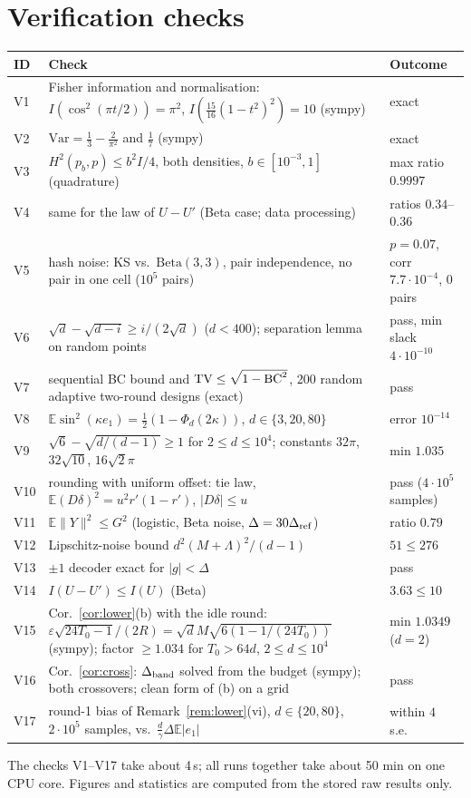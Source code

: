 \documentclass[11pt,a4paper]{article}
\numberwithin{equation}{section}
\theoremstyle{definition}
\theoremstyle{remark}
\newcommand{\E}{\mathbb E}\newcommand{\R}{\mathbb R}\newcommand{\Z}{\mathbb Z}\newcommand{\Prob}{\mathbb P}
\newcommand{\norm}[1]{\lVert #1\rVert}\newcommand{\abs}[1]{\lvert #1\rvert}\newcommand{\ip}[2]{\langle #1,#2\rangle}
\begin{document}
\appendix
\section{Verification checks}\label{app:checks}
\begin{center}\small
\begin{tabularx}{\textwidth}{@{}lXl@{}}
\toprule
ID & Check & Outcome\\
\midrule
V1 & Fisher information and normalisation: $I(\cos^2(\pi t/2))=\pi^2$, $I(\frac{15}{16}(1-t^2)^2)=10$ (sympy) & exact\\
V2 & $\mathrm{Var}=\frac13-\frac2{\pi^2}$ and $\frac17$ (sympy) & exact\\
V3 & $H^2(p_b,p)\le b^2I/4$, both densities, $b\in[10^{-3},1]$ (quadrature) & max ratio $0.9997$\\
V4 & same for the law of $U-U'$ (Beta case; data processing) & ratios $0.34$--$0.36$\\
V5 & hash noise: KS vs.\ $\mathrm{Beta}(3,3)$, pair independence, no pair in one cell ($10^5$ pairs) & $p=0.07$, corr $7.7\cdot10^{-4}$, 0 pairs\\
V6 & $\sqrt d-\sqrt{d-i}\ge i/(2\sqrt d)$ ($d<400$); separation lemma on random points & pass, min slack $4\cdot10^{-10}$\\
V7 & sequential BC bound and $\mathrm{TV}\le\sqrt{1-\mathrm{BC}^2}$, 200 random adaptive two-round designs (exact) & pass\\
V8 & $\E\sin^2(\kappa e_1)=\frac12(1-\Phi_d(2\kappa))$, $d\in\{3,20,80\}$ & error $10^{-14}$\\
V9 & $\sqrt6-\sqrt{d/(d-1)}\ge1$ for $2\le d\le10^4$; constants $32\pi$, $32\sqrt{10}$, $16\sqrt2\pi$ & min $1.035$\\
V10 & rounding with uniform offset: tie law, $\E(D\delta)^2=u^2r'(1-r')$, $\abs{D\delta}\le u$ & pass ($4\cdot10^5$ samples)\\
V11 & $\E\norm Y^2\le G^2$ (logistic, Beta noise, $\Delta=30\Delta_{\rm ref}$) & ratio $0.79$\\
V12 & Lipschitz-noise bound $d^2(M+\Lambda)^2/(d-1)$ & $51\le276$\\
V13 & $\pm1$ decoder exact for $\abs g<\Delta$ & pass\\
V14 & $I(U-U')\le I(U)$ (Beta) & $3.63\le10$\\
V15 & Cor.~\ref{cor:lower}(b) with the idle round: $\varepsilon\sqrt{24T_0-1}/(2R)=\sqrt dM\sqrt{6(1-1/(24T_0))}$ (sympy); factor $\ge1.034$ for $T_0>64d$, $2\le d\le10^4$ & min $1.0349$ ($d=2$)\\
V16 & Cor.~\ref{cor:cross}: $\Delta_{\rm band}$ solved from the budget (sympy); both crossovers; clean form of (b) on a grid & pass\\
V17 & round-1 bias of Remark~\ref{rem:lower}(vi), $d\in\{20,80\}$, $2\cdot10^5$ samples, vs.\ $\frac d\gamma\Delta\E\abs{e_1}$ & within $4$ s.e.\\
\bottomrule
\end{tabularx}
\end{center}
The checks V1--V17 take about 4\,s; all runs together take about 50 min on one CPU core. Figures and statistics are computed from the stored raw results only.
\end{document}
